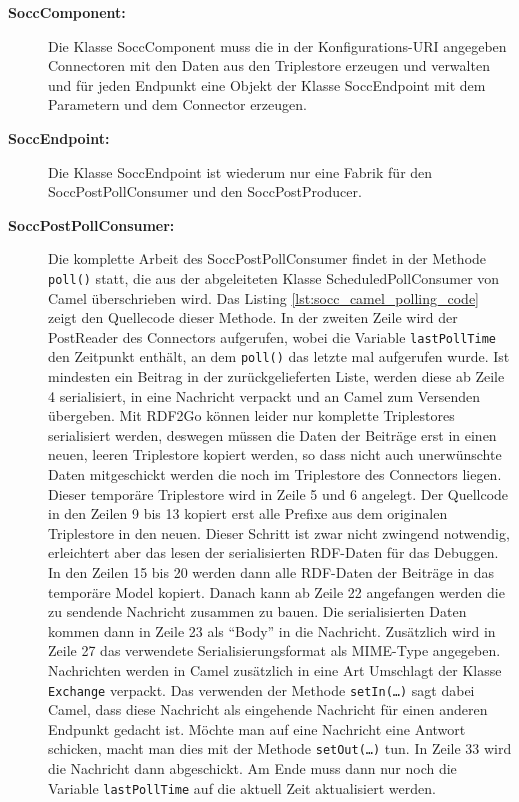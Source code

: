 \begin{description}
    \item[\textbf{SoccComponent:}] Die Klasse SoccComponent muss die in der Konfigurations-URI angegeben Connectoren mit den Daten aus den Triplestore erzeugen und verwalten und für jeden Endpunkt eine Objekt der Klasse SoccEndpoint mit dem Parametern und dem Connector erzeugen. 

    \item[\textbf{SoccEndpoint:}] Die Klasse SoccEndpoint ist wiederum nur eine Fabrik für den SoccPostPollConsumer und den SoccPostProducer. 

    \item[\textbf{SoccPostPollConsumer:}] Die komplette Arbeit des SoccPostPollConsumer findet in der Methode \texttt{poll()} statt, die aus der abgeleiteten Klasse ScheduledPollConsumer von Camel überschrieben wird. Das Listing \ref{lst:socc_camel_polling_code} zeigt den Quellecode dieser Methode. In der zweiten Zeile wird der PostReader des Connectors aufgerufen, wobei die Variable \texttt{lastPollTime} den Zeitpunkt enthält, an dem \texttt{poll()} das letzte mal aufgerufen wurde. Ist mindesten ein Beitrag in der zurückgelieferten Liste, werden diese ab Zeile 4 serialisiert, in eine Nachricht verpackt und an Camel zum Versenden übergeben. Mit RDF2Go können leider nur komplette Triplestores serialisiert werden, deswegen müssen die Daten der Beiträge erst in einen neuen, leeren Triplestore kopiert werden, so dass nicht auch unerwünschte Daten mitgeschickt werden die noch im Triplestore des Connectors liegen. Dieser temporäre Triplestore wird in Zeile 5 und 6 angelegt. Der Quellcode in den Zeilen 9 bis 13 kopiert erst alle Prefixe aus dem originalen Triplestore in den neuen. Dieser Schritt ist zwar nicht zwingend notwendig, erleichtert aber das lesen der serialisierten RDF-Daten für das Debuggen. In den Zeilen 15 bis 20 werden dann alle RDF-Daten der Beiträge in das temporäre Model kopiert. Danach kann ab Zeile 22 angefangen werden die zu sendende Nachricht zusammen zu bauen. Die serialisierten Daten kommen dann in Zeile 23 als \enquote{Body} in die Nachricht. Zusätzlich wird in Zeile 27 das verwendete Serialisierungsformat als MIME-Type angegeben. Nachrichten werden in Camel zusätzlich in eine Art Umschlagt der Klasse \texttt{Exchange} verpackt. Das verwenden der Methode \texttt{setIn(\dots)} sagt dabei Camel, dass diese Nachricht als eingehende Nachricht für einen anderen Endpunkt gedacht ist. Möchte man auf eine Nachricht eine Antwort schicken, macht man dies mit der Methode \texttt{setOut(\dots)} tun. In Zeile 33 wird die Nachricht dann abgeschickt. Am Ende muss dann nur noch die Variable \texttt{lastPollTime} auf die aktuell Zeit aktualisiert werden.
 

\end{description}
